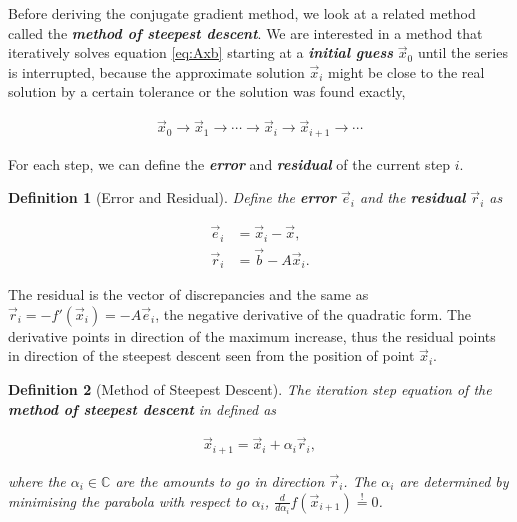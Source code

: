 \documentclass{article}
\theoremstyle{plain} %
\newtheorem{definition}{Definition}[section]
\theoremstyle{convention} %
\theoremstyle{remark} %
\def\df#1{\textbf{\textit{#1}}}
\numberwithin{equation}{section}
\begin{document}
Before deriving the conjugate gradient method, we look at a related method called the \df{method of steepest descent}. We are interested in a method that iteratively solves equation \eqref{eq:Axb} starting at a \df{initial guess} $\vec{x}_0$ until the series is interrupted, because the approximate solution $\vec{x}_i$ might be close to the real solution by a certain tolerance or the solution was found exactly,

\begin{align*}
    \vec{x}_0 \longrightarrow \vec{x}_1 \longrightarrow \dotsb \longrightarrow \vec{x}_i \longrightarrow \vec{x}_{i+1} \longrightarrow \dotsb
\end{align*}

For each step, we can define the \df{error} and \df{residual} of the current step $i$.

\begin{definition}[Error and Residual]

Define the \df{error} $\vec{e}_i$ and the \df{residual} $\vec{r}_i$ as

\begin{subequations}
    \begin{align}
        \vec{e}_i &= \vec{x}_i - \vec{x}, \label{eq:error} \\
        \vec{r}_i &= \vec{b} - A \vec{x}_i. \label{eq:residual}
    \end{align}
\end{subequations}

\end{definition}

The residual is the vector of discrepancies and the same as $\vec{r}_i = -f'(\vec{x}_i) = -A \vec{e}_i$, the negative derivative of the quadratic form. The derivative points in direction of the maximum increase, thus the residual points in direction of the steepest descent seen from the position of point $\vec{x}_i$.

\begin{definition}[Method of Steepest Descent]
The iteration step equation of the \df{method of steepest descent} in defined as

\begin{align}
    \vec{x}_{i+1} = \vec{x}_i + \alpha_i \vec{r}_i \label{eq:steepest_descent},
\end{align}

where the $\alpha_i \in \mathbb{C}$ are the amounts to go in direction $\vec{r}_i$. The $\alpha_i$ are determined by minimising the parabola with respect to $\alpha_i$, $\frac{d}{d \alpha_i} f(\vec{x}_{i+1}) \stackrel{!}{=} 0$.

\end{definition}
\end{document}
